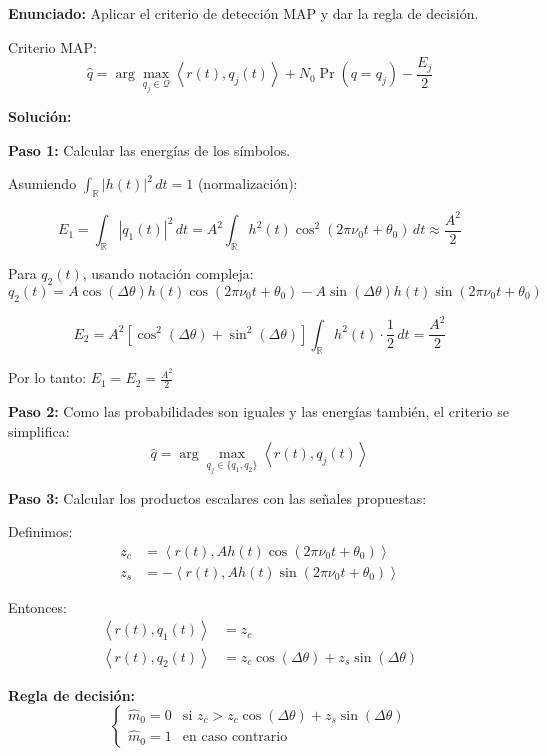 \documentclass[11pt,a4paper]{article}
\begin{document}
\textbf{Enunciado:} Aplicar el criterio de detecci\'on MAP y dar la regla de decisi\'on.

Criterio MAP:
\[
\hat{q} = \arg\max_{q_j \in \mathcal{Q}} \left\langle r(t), q_j(t) \right\rangle + N_0 \Pr(q = q_j) - \frac{E_j}{2}
\]

\vspace{0.3cm}
\textbf{Soluci\'on:}

\textbf{Paso 1:} Calcular las energ\'ias de los s\'imbolos.

Asumiendo $\int_{\mathbb{R}} |h(t)|^2\, dt = 1$ (normalizaci\'on):

\[
E_1 = \int_{\mathbb{R}} |q_1(t)|^2\, dt = A^2 \int_{\mathbb{R}} h^2(t)\cos^2(2\pi\nu_0 t + \theta_0)\, dt \approx \frac{A^2}{2}
\]

Para $q_2(t)$, usando notaci\'on compleja:
\[
q_2(t) = A\cos(\Delta\theta)h(t)\cos(2\pi\nu_0 t + \theta_0) - A\sin(\Delta\theta)h(t)\sin(2\pi\nu_0 t + \theta_0)
\]

\[
E_2 = A^2[\cos^2(\Delta\theta) + \sin^2(\Delta\theta)] \int_{\mathbb{R}} h^2(t) \cdot \frac{1}{2}\, dt = \frac{A^2}{2}
\]

Por lo tanto: $E_1 = E_2 = \frac{A^2}{2}$

\textbf{Paso 2:} Como las probabilidades son iguales y las energ\'ias tambi\'en, el criterio se simplifica:
\[
\hat{q} = \arg\max_{q_j \in \{q_1, q_2\}} \left\langle r(t), q_j(t) \right\rangle
\]

\textbf{Paso 3:} Calcular los productos escalares con las se\~nales propuestas:

Definimos:
\begin{align*}
z_c &= \left\langle r(t), Ah(t)\cos(2\pi\nu_0 t + \theta_0) \right\rangle \\
z_s &= -\left\langle r(t), Ah(t)\sin(2\pi\nu_0 t + \theta_0) \right\rangle
\end{align*}

Entonces:
\begin{align*}
\left\langle r(t), q_1(t) \right\rangle &= z_c \\
\left\langle r(t), q_2(t) \right\rangle &= z_c \cos(\Delta\theta) + z_s \sin(\Delta\theta)
\end{align*}

\textbf{Regla de decisi\'on:}
\[
\boxed{
\begin{cases}
\hat{m}_0 = 0 & \text{si } z_c > z_c \cos(\Delta\theta) + z_s \sin(\Delta\theta) \\
\hat{m}_0 = 1 & \text{en caso contrario}
\end{cases}
}
\]
\end{document}
